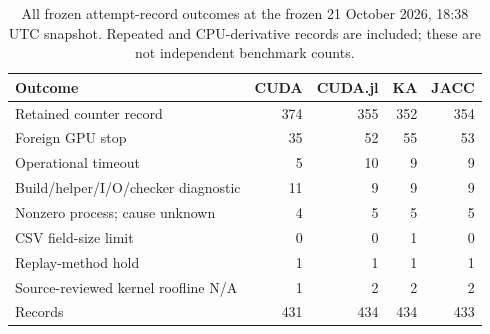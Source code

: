 \begin{table}[t]
\centering\small
\caption{All frozen attempt-record outcomes at the frozen 21 October 2026, 18:38 UTC snapshot. Repeated and CPU-derivative records are included; these are not independent benchmark counts.}
\label{tab:roofline-failures-all-frozen-attempts}
\begin{tabular}{lrrrr}
\toprule
Outcome & CUDA & CUDA.jl & KA & JACC \\
\midrule
Retained counter record & 374 & 355 & 352 & 354 \\
Foreign GPU stop & 35 & 52 & 55 & 53 \\
Operational timeout & 5 & 10 & 9 & 9 \\
Build/helper/I/O/checker diagnostic & 11 & 9 & 9 & 9 \\
Nonzero process; cause unknown & 4 & 5 & 5 & 5 \\
CSV field-size limit & 0 & 0 & 1 & 0 \\
Replay-method hold & 1 & 1 & 1 & 1 \\
Source-reviewed kernel roofline N/A & 1 & 2 & 2 & 2 \\
\midrule
Records & 431 & 434 & 434 & 433 \\
\bottomrule
\end{tabular}
\end{table}
